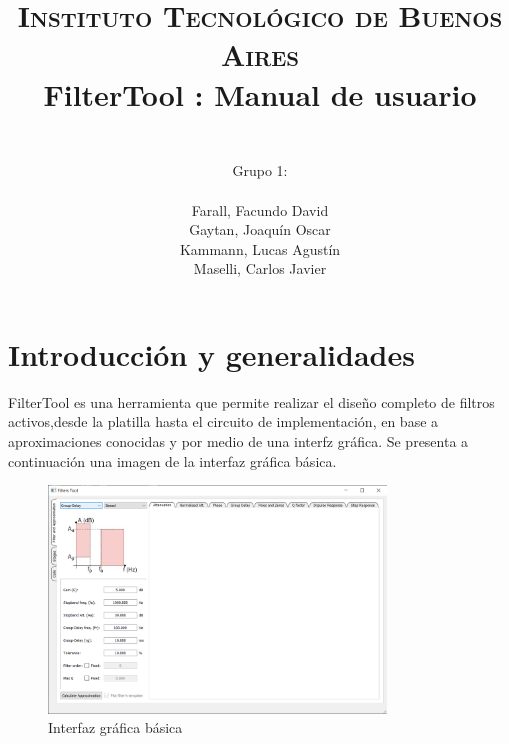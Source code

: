 



	\title{
		\normalfont \normalsize \textsc{Instituto Tecnol\'ogico de Buenos Aires} \\ [25pt]
		\huge FilterTool : Manual de usuario \\
		\author{
			\\Grupo 1:\\\\Farall, Facundo David\\Gaytan, Joaqu\'in Oscar\\Kammann, Lucas Agust\'in\\Maselli, Carlos Javier		 
		}
	}
	\maketitle
	\newpage
\newpage

	\tableofcontents
	\newpage


\section{Introducci\'on y generalidades}
FilterTool es una herramienta que permite realizar el dise\~no completo de filtros activos,desde la platilla hasta el circuito de implementaci\'on, en base a aproximaciones conocidas y por medio de una interfz gr\'afica. 
Se presenta a continuaci\'on una imagen de la interfaz gr\'afica b\'asica.
\begin{figure}[H]
    \centering
    \includegraphics[width=0.8\textwidth]{../Resources/GUI_BASIC}
    \caption{Interfaz gr\'afica b\'asica}
\end{figure} 

